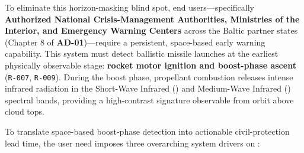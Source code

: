 To eliminate this horizon-masking blind spot, end users---specifically \textbf{Authorized National Crisis-Management Authorities, Ministries of the Interior, and Emergency Warning Centers} across the Baltic partner states (Chapter 8 of \textbf{AD-01})---require a persistent, space-based early warning capability. This system must detect ballistic missile launches at the earliest physically observable stage: \textbf{rocket motor ignition and boost-phase ascent} (\texttt{R-007}, \texttt{R-009}). During the boost phase, propellant combustion releases intense infrared radiation in the Short-Wave Infrared () and Medium-Wave Infrared () spectral bands, providing a high-contrast signature observable from orbit above cloud tops.

To translate space-based boost-phase detection into actionable civil-protection lead time, the user need imposes three overarching system drivers on :
